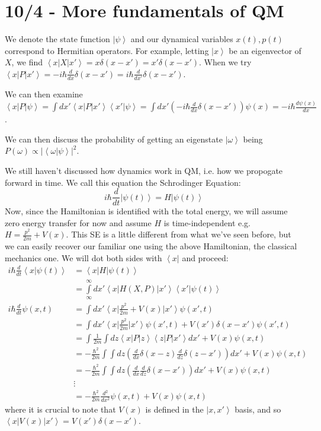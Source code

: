 \documentclass[10pt]{report}
\newcommand{\bra}[1]{\left<#1\right|}
\newcommand{\ket}[1]{\left|#1\right>}
\newcommand{\dotp}[2]{\left<#1\left.\right|#2\right>}
\newcommand{\rd}[2]{\frac{d#1}{d#2}}
\newcommand{\abs}[1]{\left|#1\right|}
\begin{document}
\chapter{10/4 - More fundamentals of QM}

We denote the state function $\ket{\psi}$ and our dynamical variables $x(t),p(t)$ correspond to Hermitian operators. For example, letting $\ket{x}$ be an eigenvector of $X$, we find $\bra{x}X\ket{x'} = x\delta(x-x')=x'\delta(x-x')$. When we try $\bra{x}P\ket{x'} = -i\hbar\rd{}{x}\delta(x-x') = i\hbar\rd{}{x'}\delta(x-x')$.

We can then examine $\bra{x}P\ket{\psi} = \int dx' \bra{x}P\ket{x'}\dotp{x'}{\psi} = \int dx' \left( -i\hbar\rd{}{x}\delta(x-x') \right)\psi(x) = -i\hbar\rd{\psi(x)}{x}$.

We can then discuss the probability of getting an eigenstate $\ket{\omega}$ being $P(\omega)\propto\abs{\dotp{\omega}{\psi}}^2$.

We still haven't discussed how dynamics work in QM, i.e. how we propogate forward in time. We call this equation the Schrodinger Equation:
$$i\hbar\rd{}{t}\ket{\psi(t)} = H\ket{\psi(t)}$$
Now, since the Hamiltonian is identified with the total energy, we will assume zero energy transfer for now and assume $H$ is time-independent e.g. $H=\frac{p^2}{2m}+ V(x)$. This SE is a little different from what we've seen before, but we can easily recover our familiar one using the above Hamiltonian, the classical mechanics one. We will dot both sides with $\bra{x}$ and proceed:
\begin{align}
	i\hbar\rd{}{t}\dotp{x}{\psi(t)} &= \bra{x}H\ket{\psi(t)}\\
	&= \displaystyle\int\limits_{\infty}^{\infty} dx' \bra{x}H(X,P)\ket{x'}\dotp{x'}{\psi(t)}\\
	i\hbar\rd{}{t}\psi(x,t)&=\int dx' \bra{x}\frac{p^2}{2m}+ V(x)\ket{x'}\psi(x',t)\\
	&= \int dx' \bra{x}\frac{p^2}{2m}\ket{x'}\psi(x',t) + V(x')\delta(x-x')\psi(x',t)\\
	&= \int \frac{1}{2m}\int dz \bra{x}P\ket{z}\bra{z}P\ket{x'}dx' + V(x)\psi(x,t)\\
	&= -\frac{\hbar^2}{2m}\int \int dz\left( \rd{}{x}\delta(x-z)\rd{}{z}\delta(z-x') \right) dx'+ V(x)\psi(x,t)\\
	&= -\frac{\hbar^2}{2m}\int \int dz\left( \rd{}{x}\rd{}{z}\delta(x-x') \right) dx'+ V(x)\psi(x,t)\\
	&\vdots\\
	&= -\frac{\hbar^2}{2m}\frac{d^2}{dx^2}\psi(x,t) + V(x)\psi(x,t)
\end{align}
where it is crucial to note that $V(x)$ is defined in the $\ket{x,x'}$ basis, and so $\bra{x}V(x)\ket{x'}=V(x')\delta(x-x')$. 
\end{document}
